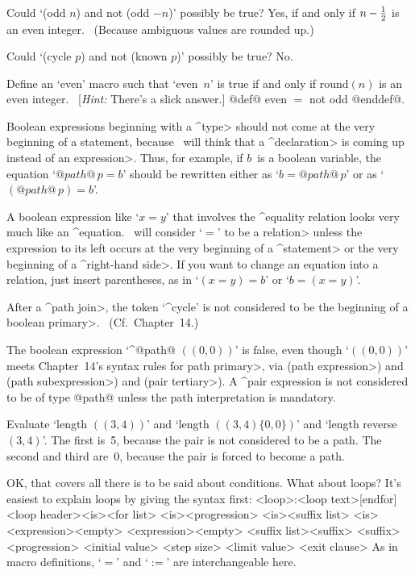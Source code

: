 \dangerexercise Could `(odd $n$) and not (odd $-n$)' possibly be true?
\answer Yes, if and only if $n-{1\over2}$ is an even integer. \ (Because
ambiguous values are rounded up.)

\dangerexercise Could `(cycle $p$) and not (known $p$)' possibly be true?
\answer No.

\dangerexercise Define an `even' macro such that `even~$n$' is true if
and only if round$(n)$ is an even integer. \ [{\sl Hint:\/} There's a
slick answer.]
\answer @def@ even $=$ not odd @enddef@.

\ddanger Boolean expressions beginning with a ^\<type> should not come
at the very beginning of a statement, because \MF\ will think that
a ^\<declaration> is coming up instead of an \<expression>. Thus, for
example, if $b$~is a boolean variable, the equation `$@path@\,p=b$'
should be rewritten either as `$b=@path@\,p$' or as `$(@path@\,p)=b$'.

\ddanger A boolean expression like `$x=y$' that involves the ^{equality}
relation looks very much like an ^{equation}. \MF\ will consider `$=$'
to be a \<relation> unless the expression to its left occurs at the
very beginning of a ^\<statement> or the very beginning of a ^\<right-hand
side>. If you want to change an equation into a relation,
just insert parentheses, as in `$(x=y)=b$' or `$b=(x=y)$'.

\ddanger After a ^\<path join>, the token `^{cycle}' is not considered
to be the beginning of a \<boolean primary>. \ (Cf.\ Chapter~14.)

\ddanger The boolean expression `^@path@ $((0,0))$' is false, even
though `$((0,0))$' meets Chapter~14's syntax rules for
\<path primary>, via (\<path expression>) and
(\<path subexpression>) and
(\<pair tertiary>). A ^{pair expression} is not considered to be
of type @path@ unless the path interpretation is mandatory.

\ddangerexercise Evaluate `length $((3,4))$' and `length $((3,4)\{0,0\})$'
and `length reverse~$(3,4)$'.
\answer The first is~5, because the pair is not considered to be a path.
The second and third are~0, because the pair is forced to become a path.

OK, that covers all there is to be said about conditions. What about
loops? It's easiest to explain loops by giving the syntax first:
\beginsyntax
<loop>:<loop text>[endfor]
<loop header><is><for list>
 <is><progression>
 <is><suffix list>
 \alt[forever]
<is>\is[=]\is<expression>\alt<empty>
 \alt<for list>[,]<expression><empty>
<suffix list>\is<suffix>
 <suffix>
<progression>
<initial value>
<step size>
<limit value>
<exit clause>
\endsyntax
As in macro definitions, `$=$' and `$:=$' are interchangeable here.

